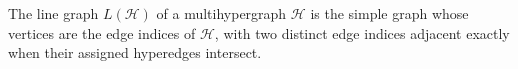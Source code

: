 \begin{definition}
The line graph $L(\mathcal H)$ of a multihypergraph $\mathcal H$ is the
simple graph whose vertices are the edge indices of $\mathcal H$, with two
distinct edge indices adjacent exactly when their assigned hyperedges
intersect.
\end{definition}
